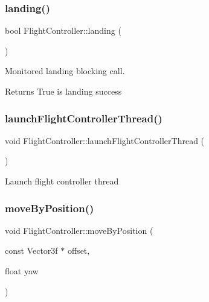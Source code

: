 \subsubsection{\texorpdfstring{landing()}{landing()}}
{\footnotesize\ttfamily bool Flight\+Controller\+::landing (\begin{DoxyParamCaption}{ }\end{DoxyParamCaption})}

Monitored landing blocking call. \begin{DoxyReturn}{Returns}
True is landing success 
\end{DoxyReturn}
\mbox{\label{class_m210_1_1_flight_controller_afb8ae49d6b33d9e45b35b626cb51446a}} 
\subsubsection{\texorpdfstring{launch\+Flight\+Controller\+Thread()}{launchFlightControllerThread()}}
{\footnotesize\ttfamily void Flight\+Controller\+::launch\+Flight\+Controller\+Thread (\begin{DoxyParamCaption}{ }\end{DoxyParamCaption})}

Launch flight controller thread \mbox{\label{class_m210_1_1_flight_controller_a9d2685ace4ecff840505a37b348c6860}} 
\subsubsection{\texorpdfstring{move\+By\+Position()}{moveByPosition()}}
{\footnotesize\ttfamily void Flight\+Controller\+::move\+By\+Position (\begin{DoxyParamCaption}\item[{const Vector3f $\ast$}]{offset,  }\item[{float}]{yaw }\end{DoxyParamCaption})}

